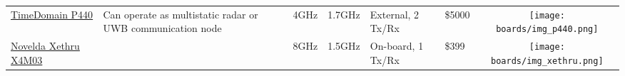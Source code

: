 \begin{longtable}[]{@{}llllllc@{}}
\begin{minipage}[t]{\colwidthA}\raggedright\strut
	\href{http://www.timedomain.com/products/pulson-440/}{TimeDomain P440}
\strut\end{minipage} &
\begin{minipage}[t]{\colwidthB}\raggedright\strut
Can operate as multistatic radar or UWB communication node
\strut\end{minipage} &
\begin{minipage}[t]{\colwidthC}\raggedright\strut
4GHz
\strut\end{minipage} &
\begin{minipage}[t]{\colwidthD}\raggedright\strut
1.7GHz
\strut\end{minipage} &
\begin{minipage}[t]{\colwidthE}\raggedright\strut
External, 2 Tx/Rx
\strut\end{minipage} &
\begin{minipage}[t]{\colwidthF}\raggedright\strut
\$5000
\strut\end{minipage} &
\begin{minipage}[t]{\colwidthG}\centering\strut
\texttt{[image: boards/img\_p440.png]}
\strut\end{minipage}\tabularnewline

\begin{minipage}[t]{\colwidthA}\raggedright\strut
	\href{https://www.xethru.com/xethru-development-platform.html}{Novelda Xethru X4M03}
\strut\end{minipage} &
\begin{minipage}[t]{\colwidthB}\raggedright\strut

\strut\end{minipage} &
\begin{minipage}[t]{\colwidthC}\raggedright\strut
8GHz
\strut\end{minipage} &
\begin{minipage}[t]{\colwidthD}\raggedright\strut
1.5GHz
\strut\end{minipage} &
\begin{minipage}[t]{\colwidthE}\raggedright\strut
On-board, 1 Tx/Rx
\strut\end{minipage} &
\begin{minipage}[t]{\colwidthF}\raggedright\strut
\$399
\strut\end{minipage} &
\begin{minipage}[t]{\colwidthG}\centering\strut
\texttt{[image: boards/img\_xethru.png]}
\strut\end{minipage}\tabularnewline


\end{longtable}
